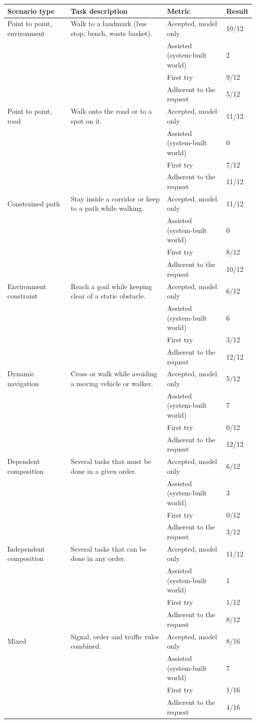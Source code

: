 \begin{longtable}{p{2.6cm}p{5.2cm}p{3.4cm}p{3.2cm}}
\toprule
Scenario type & Task description & Metric & Result\\
\midrule
\endhead
Point to point, environment & Walk to a landmark (bus stop, bench, waste basket). & Accepted, model only & 10/12\\
 & & Assisted (system-built world) & 2\\
 & & First try & 9/12\\
 & & Adherent to the request & 5/12\\ \midrule
Point to point, road & Walk onto the road or to a spot on it. & Accepted, model only & 11/12\\
 & & Assisted (system-built world) & 0\\
 & & First try & 7/12\\
 & & Adherent to the request & 11/12\\ \midrule
Constrained path & Stay inside a corridor or keep to a path while walking. & Accepted, model only & 11/12\\
 & & Assisted (system-built world) & 0\\
 & & First try & 8/12\\
 & & Adherent to the request & 10/12\\ \midrule
Environment constraint & Reach a goal while keeping clear of a static obstacle. & Accepted, model only & 6/12\\
 & & Assisted (system-built world) & 6\\
 & & First try & 3/12\\
 & & Adherent to the request & 12/12\\ \midrule
Dynamic navigation & Cross or walk while avoiding a moving vehicle or walker. & Accepted, model only & 5/12\\
 & & Assisted (system-built world) & 7\\
 & & First try & 0/12\\
 & & Adherent to the request & 12/12\\ \midrule
Dependent composition & Several tasks that must be done in a given order. & Accepted, model only & 6/12\\
 & & Assisted (system-built world) & 3\\
 & & First try & 0/12\\
 & & Adherent to the request & 3/12\\ \midrule
Independent composition & Several tasks that can be done in any order. & Accepted, model only & 11/12\\
 & & Assisted (system-built world) & 1\\
 & & First try & 1/12\\
 & & Adherent to the request & 8/12\\ \midrule
Mixed & Signal, order and traffic rules combined. & Accepted, model only & 8/16\\
 & & Assisted (system-built world) & 7\\
 & & First try & 1/16\\
 & & Adherent to the request & 4/16\\ \midrule
\bottomrule
\end{longtable}
